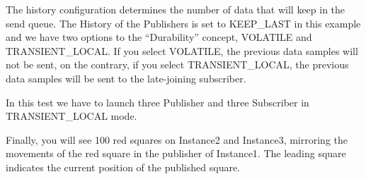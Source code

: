\documentclass[letterpaper,10pt,english]{sphinxmanual}
\begin{document}
The history configuration determines the number of data that will keep in the send queue. The History of the Publishers is set to KEEP\_LAST in this example and we have two options to the “Durability” concept, VOLATILE and TRANSIENT\_LOCAL. If you select VOLATILE, the previous data samples will not be sent, on the contrary, if you select TRANSIENT\_LOCAL, the  previous data samples will be sent to the late-joining subscriber.

In this test we have to launch three Publisher and three Subscriber in TRANSIENT\_LOCAL mode.

Finally, you will see 100 red squares on Instance2 and Instance3, mirroring the movements of the red square in the publisher of Instance1. The leading square indicates the current position of the published square.

\end{document}
